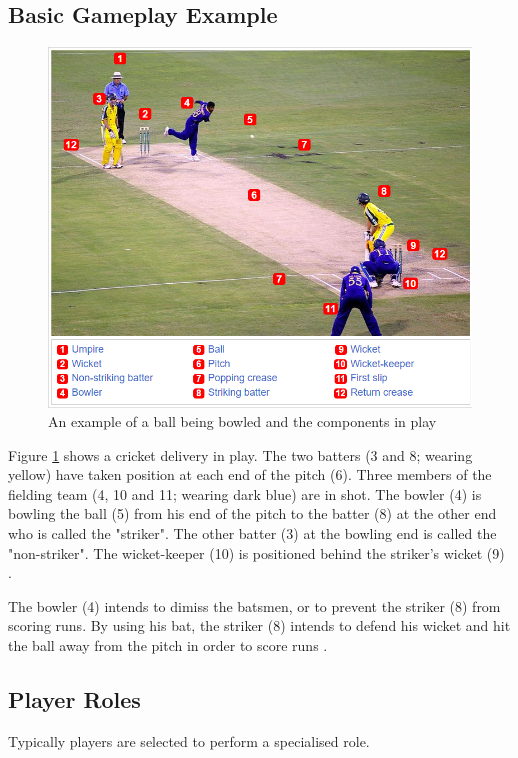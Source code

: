\documentclass[12pt,a4paper]{report}
\theoremstyle{definition}
\begin{document}
\subsection{Basic Gameplay Example}

\begin{figure}[H]
    \centering
    \includegraphics[width=0.8\linewidth]{Cricket_Delivery.png}
    \caption{An example of a ball being bowled and the components in play \citep{cricketWiki}}
    \label{fig:Delivery}
\end{figure}

Figure \ref{fig:Delivery} shows a cricket delivery in play. 
The two batters (3 and 8; wearing yellow) have taken position at each end of the pitch (6). 
Three members of the fielding team (4, 10 and 11; wearing dark blue) are in shot. 
The bowler (4) is bowling the ball (5) from his end of the pitch to the batter (8) at the other end who is called the "striker". 
The other batter (3) at the bowling end is called the "non-striker". 
The wicket-keeper (10) is positioned behind the striker's wicket (9) \citep{cricketWiki}.

The bowler (4) intends to dimiss the batsmen, or to prevent the striker (8) from scoring runs. 
By using his bat, the striker (8) intends to defend his wicket and hit the ball away from the pitch in order to score runs \citep{cricketWiki}.

\subsection{Player Roles}

Typically players are selected to perform a specialised role.
\end{document}
